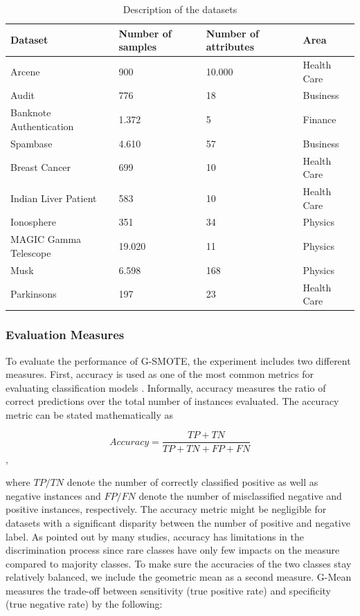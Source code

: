 \documentclass[parskip=full]{scrartcl}
\begin{document}
\begin{table}[H]
	\centering
	\begin{tabular}{|l|l|l|l|}
		\hline
		\textbf{Dataset} & \textbf{Number of samples} & \textbf{Number of 
		attributes} & \textbf{Area} \\
		\hline
		Arcene & 900 & 10.000 & Health Care \\
		\hline
		Audit & 776 & 18 & Business \\
		\hline
		Banknote Authentication & 1.372 & 5 & Finance \\
		\hline
		Spambase & 4.610 & 57 & Business\\
		\hline
		Breast Cancer & 699 & 10 & Health Care\\
		\hline
		Indian Liver Patient & 583 & 10 & Health Care\\
		\hline
		Ionosphere & 351 & 34 & Physics\\
		\hline
		MAGIC Gamma Telescope & 19.020 & 11 & Physics\\
		\hline
		Musk & 6.598 & 168 & Physics\\
		\hline
		Parkinsons & 197 & 23 & Health Care\\
		\hline
	\end{tabular}
\caption{\label{tab:datasets}Description of the datasets}
\end{table}

\subsubsection{Evaluation Measures}

To evaluate the performance of G-SMOTE, the experiment includes two different 
measures. First, accuracy is used as one of the most common metrics for 
evaluating classification models \cite{M.2015}. Informally, accuracy measures 
the ratio of correct predictions over the total number of instances evaluated. 
The accuracy metric can be stated mathematically as

\[Accuracy = \frac{TP + TN}{TP + TN + FP + FN}\],

where $\mathit{TP/TN}$ denote the number of correctly classified positive as 
well as negative instances and $\mathit{FP/FN}$ denote the number of 
misclassified negative and positive instances, respectively. The accuracy 
metric might be negligible for datasets with a significant disparity between 
the number of positive and negative label. As pointed out by many studies, 
accuracy has limitations in the discrimination process since rare classes have 
only few impacts on the measure compared to majority classes. To make sure the 
accuracies of the two classes stay relatively balanced, we include the 
geometric mean as a second measure. G-Mean measures the trade-off between 
sensitivity (true positive rate) and specificity (true negative rate) by the 
following:
\end{document}
